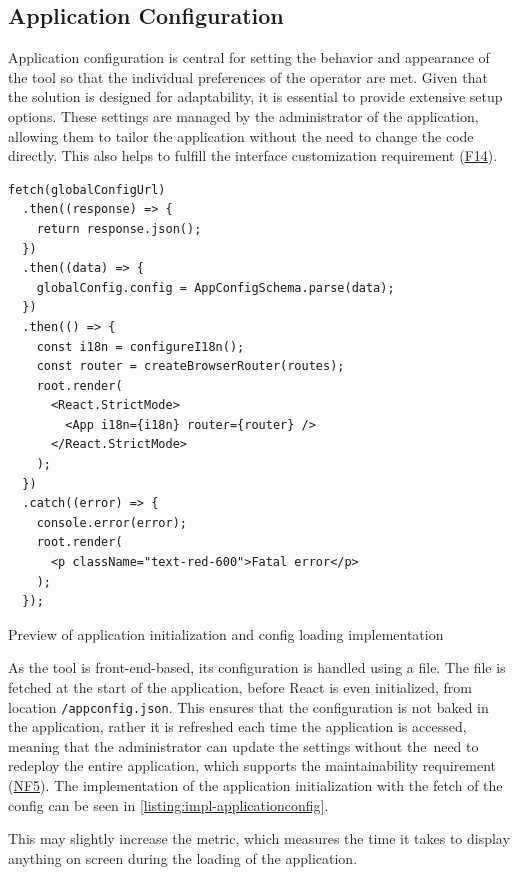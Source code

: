 \subsection{Application Configuration}

Application configuration is central for setting the behavior and appearance of the tool so that the individual preferences of the operator are met. Given that the solution is designed for adaptability, it is essential to provide extensive setup options. These settings are managed by the administrator of the application, allowing them to tailor the application without the need to change the code directly. This also helps to fulfill the interface customization requirement (\hyperref[itm:F14]{F14}).

\begin{listing}[h]
\begin{verbatim}
fetch(globalConfigUrl)
  .then((response) => {
    return response.json();
  })
  .then((data) => {
    globalConfig.config = AppConfigSchema.parse(data);
  })
  .then(() => {
    const i18n = configureI18n();
    const router = createBrowserRouter(routes);
    root.render(
      <React.StrictMode>
        <App i18n={i18n} router={router} />
      </React.StrictMode>
    );
  })
  .catch((error) => {
    console.error(error);
    root.render(
      <p className="text-red-600">Fatal error</p>
    );
  });
\end{verbatim}
\caption{Preview of application initialization and config loading implementation}
\label{listing:impl-applicationconfig}
\end{listing}

As the tool is front-end-based, its configuration is handled using a  file. The file is fetched at the start of the application, before React is even initialized, from location \texttt{/appconfig.json}. This ensures that the configuration is not baked in the application, rather it is refreshed each time the application is accessed, meaning that the administrator can update the settings without the~need to redeploy the entire application, which supports the maintainability requirement (\hyperref[itm:NF5]{NF5}). The implementation of the application initialization with the fetch of the config can be seen in \autoref{listing:impl-applicationconfig}. 

This may slightly increase the  metric, which measures the time it takes to display anything on screen during the loading of the application.~\cite{Walton2023}

